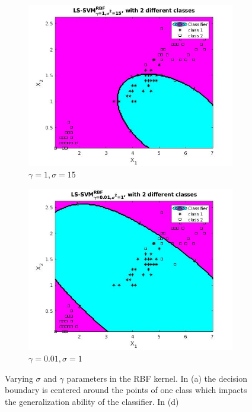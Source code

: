 \documentclass{article}
\begin{document}
\begin{figure}[]
\begin{subfigure}{0.50\linewidth}
            \includegraphics[width=\linewidth]{RBFgam1sig15}
            \caption{$\gamma=1, \sigma=15$}
        \end{subfigure}
           \begin{subfigure}{0.50\linewidth}
            \includegraphics[width=\linewidth]{RBFsigma1gamma001}
            \caption{$\gamma=0.01, \sigma=1$}
        \end{subfigure}
   
        \caption{Varying $\sigma$ and $\gamma$ parameters in the RBF kernel. In (a) the decision boundary is centered around the points of one class which impacts the generalization ability of the classifier. In (d)  }                 
        
        \label{fig:irisrbf}
    \end{figure}
\end{document}
